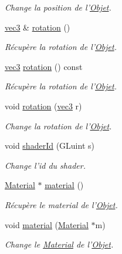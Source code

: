 \begin{DoxyCompactItemize}
\begin{DoxyCompactList}\small\item\em Change la position de l'\hyperlink{class_objet}{Objet}. \end{DoxyCompactList}\item 
\hyperlink{structvec3}{vec3} \& \hyperlink{class_objet_ac69a1b459bcb4433099c8cfbff06b209}{rotation} ()
\begin{DoxyCompactList}\small\item\em Récupère la rotation de l'\hyperlink{class_objet}{Objet}. \end{DoxyCompactList}\item 
\hyperlink{structvec3}{vec3} \hyperlink{class_objet_a0325e52c600e8de17312287b4f7a3e67}{rotation} () const 
\begin{DoxyCompactList}\small\item\em Récupère la rotation de l'\hyperlink{class_objet}{Objet}. \end{DoxyCompactList}\item 
void \hyperlink{class_objet_a2d37f15368f40615a8bc58622623d991}{rotation} (\hyperlink{structvec3}{vec3} r)
\begin{DoxyCompactList}\small\item\em Change la rotation de l'\hyperlink{class_objet}{Objet}. \end{DoxyCompactList}\item 
void \hyperlink{class_objet_a13f08bf7d1265bbf4ade92b755b27c1b}{shader\+Id} (G\+Luint s)
\begin{DoxyCompactList}\small\item\em Change l'id du shader. \end{DoxyCompactList}\item 
\hyperlink{class_material}{Material} $\ast$ \hyperlink{class_objet_a5b8f371853435fb08bba5163cb4dbe09}{material} ()
\begin{DoxyCompactList}\small\item\em Récupère le material de l'\hyperlink{class_objet}{Objet}. \end{DoxyCompactList}\item 
void \hyperlink{class_objet_a470e028ee53141cf9d11d107317989b7}{material} (\hyperlink{class_material}{Material} $\ast$m)
\begin{DoxyCompactList}\small\item\em Change le \hyperlink{class_material}{Material} de l'\hyperlink{class_objet}{Objet}. \end{DoxyCompactList}\item 

\end{DoxyCompactItemize}
